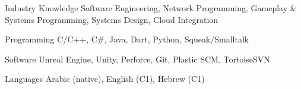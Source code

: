 

\begin{cvskills}

  \cvskill
  {Industry Knowledge}
  {Software Engineering, Network Programming, Gameplay \& Systems Programming, Systems Design, Cloud Integration} %

  \cvskill
    {Programming} %
    {C/C++, C\#, Java, Dart, Python, Squeak/Smalltalk} %

  \cvskill
    {Software} %
    {Unreal Engine, Unity, Perforce, Git, Plastic SCM, TortoiseSVN} %

  \cvskill
    {Languages} %
    {Arabic (native), English (C1), Hebrew (C1)} %

\end{cvskills}